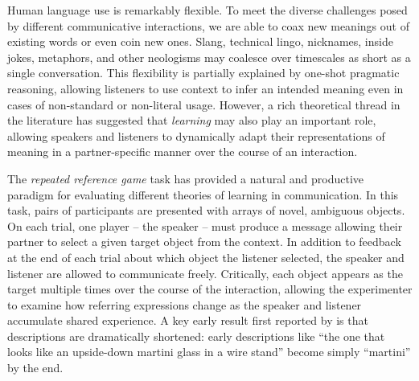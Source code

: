 \documentclass[alpha-refs]{wiley-article}
\begin{document}
Human language use is remarkably flexible. %
To meet the diverse challenges posed by different communicative interactions, we are able to coax new meanings out of existing words or even coin new ones. 
Slang, technical lingo, nicknames, inside jokes, metaphors, and other neologisms may coalesce over timescales as short as a single conversation. %
This flexibility is partially explained by one-shot pragmatic reasoning, allowing listeners to use context to infer an intended meaning even in cases of non-standard or non-literal usage.
However, a rich theoretical thread in the literature has suggested that \emph{learning} may also play an important role, allowing speakers and listeners to dynamically adapt their representations of meaning in a partner-specific manner over the course of an interaction.

The \emph{repeated reference game} task has provided a natural and productive paradigm for evaluating different theories of learning in communication.
In this task, pairs of participants are presented with arrays of novel, ambiguous objects. 
On each trial, one player -- the speaker -- must produce a message allowing their partner to select a given target object from the context.
In addition to feedback at the end of each trial about which object the listener selected, the speaker and listener are allowed to communicate freely. 
Critically, each object appears as the target multiple times over the course of the interaction, allowing the experimenter to examine how referring expressions change as the speaker and listener accumulate shared experience.
A key early result first reported by \cite{KraussWeinheimer64_ReferencePhrases} is that descriptions are dramatically shortened: early descriptions like ``the one that looks like an upside-down martini glass in a wire stand'' become simply ``martini'' by the end. 
\end{document}
